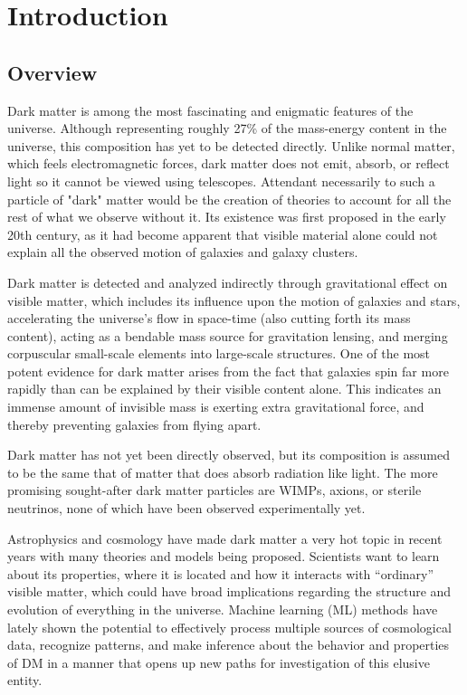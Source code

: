 

\chapter{Introduction}

\section{Overview}
                     
Dark matter is among the most fascinating and enigmatic features of the universe. Although representing roughly 27\% of the mass-energy content in the universe, this composition has yet to be detected directly.\cite{planck2016} Unlike normal matter, which feels electromagnetic forces, dark matter does not emit, absorb, or reflect light so it cannot be viewed using telescopes. Attendant necessarily to such a particle of "dark" matter would be the creation of theories to account for all the rest of what we observe without it. Its existence was first proposed in the early 20th century, as it had become apparent that visible material alone could not explain all the observed motion of galaxies and galaxy clusters.

Dark matter is detected and analyzed indirectly through gravitational effect on visible matter, which includes its influence upon the motion of galaxies and stars, accelerating the universe's flow in space-time (also cutting forth its mass content), acting as a bendable mass source for gravitation lensing, and merging corpuscular small-scale elements into large-scale structures. One of the most potent evidence for dark matter arises from the fact that galaxies spin far more rapidly than can be explained by their visible content alone.\cite{rubin1970} This indicates an immense amount of invisible mass is exerting extra gravitational force, and thereby preventing galaxies from flying apart.

Dark matter has not yet been directly observed, but its composition is assumed to be the same that of matter that does absorb radiation like light. The more promising sought-after dark matter particles are WIMPs, axions, or sterile neutrinos, none of which have been observed experimentally yet.

Astrophysics and cosmology have made dark matter a very hot topic in recent years with many theories and models being proposed. Scientists want to learn about its properties, where it is located and how it interacts with “ordinary” visible matter, which could have broad implications regarding the structure and evolution of everything in the universe. Machine learning (ML) methods have lately shown the potential to effectively process multiple sources of cosmological data, recognize patterns, and make inference about the behavior and properties of DM in a manner that opens up new paths for investigation of this elusive entity.

